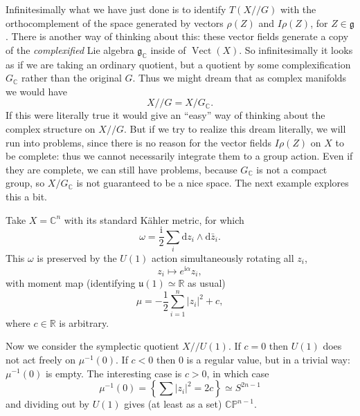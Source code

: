 \documentclass[12pt,letterpaper,reqno]{article}
\numberwithin{equation}{section}
\newcommand{\fg}{{\mathfrak g}}
\newcommand{\fu}{{\mathfrak u}}
\newcommand{\R}{\ensuremath{\mathbb R}}
\newcommand{\C}{\ensuremath{\mathbb C}}
\newcommand{\PP}{\ensuremath{\mathbb P}}
\newcommand{\half}{\ensuremath{\frac{1}{2}}}
\newcommand{\kahler}{K\"ahler\xspace}
\newcommand{\kq}{/\!\!/}
\newcommand{\I}{{\mathrm i}}
\newcommand{\de}{\mathrm{d}}
\newcommand{\abs}[1]{\lvert#1\rvert}
\newcommand{\ti}[1]{\textit{#1}}
\DeclareMathOperator{\Vect}{Vect}
\begin{document}
Infinitesimally what we have just done is to
identify $T(X \kq G)$ with the orthocomplement
of the space generated by
vectors $\rho(Z)$ and $I \rho(Z)$, for $Z \in \fg$.
There is another way of thinking about this:
these vector fields generate a copy of the \ti{complexified}
Lie algebra $\fg_\C$ inside of $\Vect(X)$.
So infinitesimally it looks as if we are
taking an ordinary quotient, but a quotient
by some complexification $G_\C$ rather than
the original $G$.
Thus we might dream that as complex manifolds we would have
\begin{equation}
  X \kq G = X / G_\C.
\end{equation}
If this were literally true it would give an ``easy'' way of thinking about
the complex structure on $X \kq G$.
But if we try to realize this dream literally, we will run into
problems, since there is no reason for the vector fields
$I \rho(Z)$ on $X$ to be complete: thus we cannot necessarily
integrate them to a group action.
Even if they are complete,
we can still have problems, because $G_\C$
is not a compact group, so $X / G_\C$
is not guaranteed to be a nice space.
The next example
explores this a bit.

\begin{example}[Projective space as a \kahler quotient]
Take $X = \C^n$ with its standard \kahler metric, for
which
\begin{equation}
\omega = \frac{\I}{2} \sum_i \de z_i \wedge \de \bar{z}_i.
\end{equation}
This $\omega$ is preserved by the $U(1)$ action simultaneously
rotating all $z_i$,
\begin{equation}
  z_i \mapsto e^{\I \alpha} z_i,
\end{equation}
with moment map (identifying $\fu(1) \simeq \R$ as usual)
\begin{equation}
  \mu = - \half \sum_{i=1}^n \abs{z_i}^2 + c,
\end{equation}
where $c \in \R$ is arbitrary.

Now we consider the symplectic quotient $X \kq U(1)$. If $c = 0$
then $U(1)$ does not act freely on $\mu^{-1}(0)$. If $c < 0$ then $0$
is a regular value, but in a trivial way: $\mu^{-1}(0)$ is empty.
The interesting case is $c > 0$, in which case
\begin{equation}
  \mu^{-1}(0) = \left\{ \sum \abs{z_i}^2 = 2c \right\} \simeq S^{2n-1}
\end{equation}
and dividing out by $U(1)$ gives (at least as a set) $\C\PP^{n-1}$.
\end{example}
\end{document}
